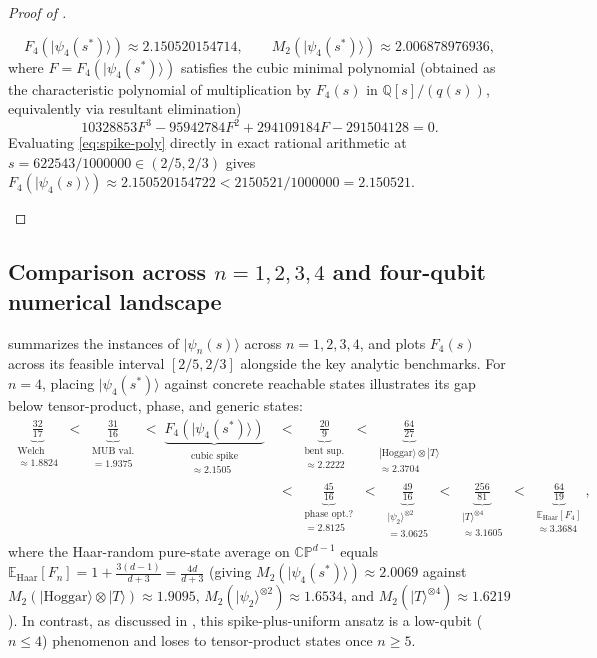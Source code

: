 \documentclass[11pt,a4paper]{article}
\theoremstyle{plain}
\theoremstyle{definition}
\theoremstyle{remark}
\newcommand{\Q}{\mathbb{Q}}
\newcommand{\CP}{\mathbb{CP}}
\newcommand{\ket}[1]{|#1\rangle}
\numberwithin{equation}{section}
\begin{document}
\begin{proof}[Proof of ]
\begin{itemize}[leftmargin=1.8em]
  \[
    F_4(\ket{\psi_4(s^*)}) \approx 2.150520154714, \qquad M_2(\ket{\psi_4(s^*)}) \approx 2.006878976936,
  \]
  where $F = F_4(\ket{\psi_4(s^*)})$ satisfies the cubic minimal polynomial (obtained as the characteristic polynomial of multiplication by $F_4(s)$ in $\Q[s]/(q(s))$, equivalently via resultant elimination)
  \[
    10328853 F^3 - 95942784 F^2 + 294109184 F - 291504128 = 0.
  \]
  Evaluating \eqref{eq:spike-poly} directly in exact rational arithmetic at $s = 622543/1000000 \in (2/5, 2/3)$ gives $F_4(\ket{\psi_4(s)}) \approx 2.150520154722 < 2150521/1000000 = 2.150521$. \qedhere
\end{itemize}
\end{proof}

\subsection{Comparison across \texorpdfstring{$n = 1, 2, 3, 4$}{n = 1, 2, 3, 4} and four-qubit numerical landscape}

 summarizes the instances of $\ket{\psi_n(s)}$ across $n = 1, 2, 3, 4$, and  plots $F_4(s)$ across its feasible interval $[2/5, 2/3]$ alongside the key analytic benchmarks. For $n = 4$, placing $\ket{\psi_4(s^*)}$ against concrete reachable states illustrates its gap below tensor-product, phase, and generic states:
\begin{align*}
  \underbrace{\frac{32}{17}}_{\substack{\text{Welch} \\ \approx 1.8824}}
  \;<\; \underbrace{\frac{31}{16}}_{\substack{\text{MUB val.} \\ = 1.9375}}
  \;<\; \underbrace{F_4(\ket{\psi_4(s^*)})}_{\substack{\text{cubic spike} \\ \approx 2.1505}}
  &\;<\; \underbrace{\frac{20}{9}}_{\substack{\text{bent sup.} \\ \approx 2.2222}}
  \;<\; \underbrace{\frac{64}{27}}_{\substack{\ket{\mathrm{Hoggar}}\otimes\ket{T} \\ \approx 2.3704}} \\
  &\;<\; \underbrace{\frac{45}{16}}_{\substack{\text{phase opt.?} \\ = 2.8125}}
  \;<\; \underbrace{\frac{49}{16}}_{\substack{\ket{\psi_2}^{\otimes 2} \\ = 3.0625}}
  \;<\; \underbrace{\frac{256}{81}}_{\substack{\ket{T}^{\otimes 4} \\ \approx 3.1605}}
  \;<\; \underbrace{\frac{64}{19}}_{\substack{\mathbb{E}_{\mathrm{Haar}}[F_4] \\ \approx 3.3684}},
\end{align*}
where the Haar-random pure-state average on $\CP^{d-1}$ equals $\mathbb{E}_{\mathrm{Haar}}[F_n] = 1 + \frac{3(d-1)}{d+3} = \frac{4d}{d+3}$ (giving $M_2(\ket{\psi_4(s^*)}) \approx 2.0069$ against $M_2(\ket{\mathrm{Hoggar}}\otimes\ket{T}) \approx 1.9095$, $M_2(\ket{\psi_2}^{\otimes 2}) \approx 1.6534$, and $M_2(\ket{T}^{\otimes 4}) \approx 1.6219$). In contrast, as discussed in , this spike-plus-uniform ansatz is a low-qubit ($n \le 4$) phenomenon and loses to tensor-product states once $n \ge 5$.
\end{document}
